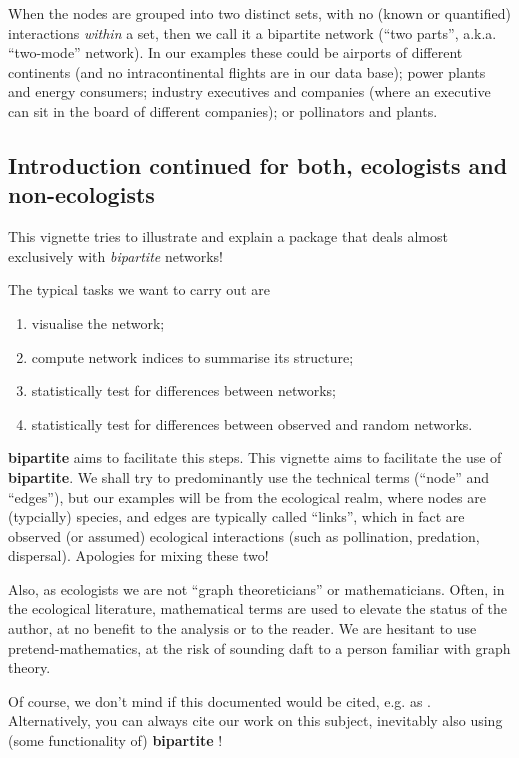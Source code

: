 \documentclass[a4paper, 11pt]{article}\usepackage[]{graphicx}\usepackage[]{color}
\newcommand{\package}[1]{\textbf{#1}}
\begin{document}
When the nodes are grouped into two distinct sets, with no (known or quantified) interactions \emph{within} a set, then we call it a bipartite network (``two parts'', a.k.a. ``two-mode'' network). In our examples these could be airports of different continents (and no intracontinental flights are in our data base); power plants and energy consumers; industry executives and companies (where an executive can sit in the board of different companies); or pollinators and plants.

\subsection{Introduction continued for both, ecologists and non-ecologists}
This vignette tries to illustrate and explain a package that deals almost exclusively with \emph{bipartite} networks!

The typical tasks we want to carry out are
\begin{enumerate}
\item visualise the network;
\item compute network indices to summarise its structure;
\item statistically test for differences between networks;
\item statistically test for differences between observed and random networks.
\end{enumerate}
\package{bipartite} aims to facilitate this steps. This vignette aims to facilitate the use of \package{bipartite}. We shall try to predominantly use the technical terms (``node'' and ``edges''), but our examples will be from the ecological realm, where nodes are (typcially) species, and edges are typically called ``links'', which in fact are observed (or assumed) ecological interactions (such as pollination, predation, dispersal). Apologies for mixing these two!

Also, as ecologists we are not ``graph theoreticians'' or mathematicians. Often, in the ecological literature, mathematical terms are used to elevate the status of the author, at no benefit to the analysis or to the reader. We are hesitant to use pretend-mathematics, at the risk of sounding daft to a person familiar with graph theory.

Of course, we don't mind if this documented would be cited, e.g. as \citet{bipartiteVignette}. Alternatively, you can always cite our work on this subject, inevitably also using (some functionality of) \package{bipartite} \citep{Dormann2008, Dormann2009, Dormann2011, Dormann2014, Dormann2017, Dormann2017a}!
\end{document}
